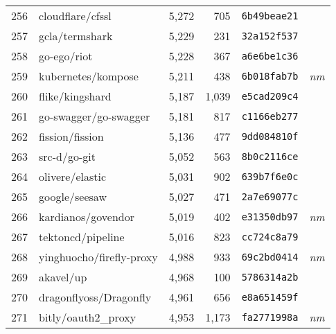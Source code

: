 {\begin{supertabular}{llrrll}
        256 &                   cloudflare/cfssl &  5,272 &    705 &  \texttt{6b49beae21} &              \\
        257 &                     gcla/termshark &  5,229 &    231 &  \texttt{32a152f537} &              \\
        258 &                        go-ego/riot &  5,228 &    367 &  \texttt{a6e6be1c36} &              \\
        259 &                 kubernetes/kompose &  5,211 &    438 &  \texttt{6b018fab7b} &  \textit{nm} \\
        260 &                    flike/kingshard &  5,187 &  1,039 &  \texttt{e5cad209c4} &              \\
        261 &              go-swagger/go-swagger &  5,181 &    817 &  \texttt{c1166eb277} &              \\
        262 &                    fission/fission &  5,136 &    477 &  \texttt{9dd084810f} &              \\
        263 &                       src-d/go-git &  5,052 &    563 &  \texttt{8b0c2116ce} &              \\
        264 &                    olivere/elastic &  5,031 &    902 &  \texttt{639b7f6e0c} &              \\
        265 &                      google/seesaw &  5,027 &    471 &  \texttt{2a7e69077c} &              \\
        266 &                 kardianos/govendor &  5,019 &    402 &  \texttt{e31350db97} &  \textit{nm} \\
        267 &                  tektoncd/pipeline &  5,016 &    823 &  \texttt{cc724c8a79} &              \\
        268 &           yinghuocho/firefly-proxy &  4,988 &    933 &  \texttt{69c2bd0414} &  \textit{nm} \\
        269 &                          akavel/up &  4,968 &    100 &  \texttt{5786314a2b} &              \\
        270 &             dragonflyoss/Dragonfly &  4,961 &    656 &  \texttt{e8a651459f} &              \\
        271 &                bitly/oauth2\_proxy &  4,953 &  1,173 &  \texttt{fa2771998a} &  \textit{nm} \\

\end{supertabular}}
